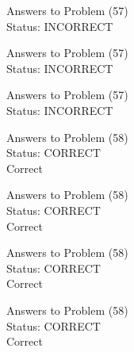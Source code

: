 \documentclass[11pt]{article}
\begin{document}
\begin{minipage}[t]{0.5\textwidth}
  {\centering
  
  Answers to Problem (57)\\
  Status: INCORRECT\\
  
  }
\end{minipage}
\begin{minipage}[t]{0.5\textwidth}
  {\centering
  
  Answers to Problem (57)\\
  Status: INCORRECT\\
  
  }
\end{minipage}
\begin{minipage}[t]{0.5\textwidth}
  {\centering
  
  Answers to Problem (57)\\
  Status: INCORRECT\\
  
  }
\end{minipage}
\begin{minipage}[t]{0.5\textwidth}
  {\centering
  
  Answers to Problem (58)\\
  Status: CORRECT\\
  Correct\\
  }
\end{minipage}
\begin{minipage}[t]{0.5\textwidth}
  {\centering
  
  Answers to Problem (58)\\
  Status: CORRECT\\
  Correct\\
  }
\end{minipage}
\begin{minipage}[t]{0.5\textwidth}
  {\centering
  
  Answers to Problem (58)\\
  Status: CORRECT\\
  Correct\\
  }
\end{minipage}
\begin{minipage}[t]{0.5\textwidth}
  {\centering
  
  Answers to Problem (58)\\
  Status: CORRECT\\
  Correct\\
  }
\end{minipage}
\end{document}
